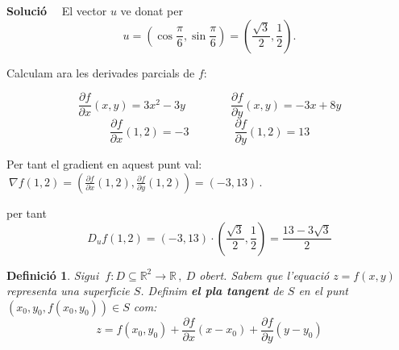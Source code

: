 \documentclass[12pt]{article}
\newcommand{\solucio}{\textbf{Soluci{\'o}}\ \ }
\newtheorem{definicio}{Definici{\'o}}[subsection]
\newtheorem{exemple}{Exemple}[subsection]
\newcommand{\R}{\mathbb{R}}
\begin{document}
\solucio
El vector $u$ ve donat per
\[
u=\left(\cos \frac{\pi}{6},\sin \frac{\pi}{6}\right)= \left(\frac{\sqrt{3}}{2}
,\frac{1}{2}\right).
\]

Calculam ara les derivades parcials de $f$:

$$
\frac{\partial f}{\partial x}(x,y)=3 x^2-3y\qquad\qquad \frac{\partial f}{\partial y}(x,y)=-3x+8 y
$$
$$
\frac{\partial f}{\partial x}(1,2)=-3 \qquad\qquad \frac{\partial f}{\partial y}(1,2)=13
$$

Per tant el gradient en aquest punt val: $\ \nabla f(1,2)=\left(\frac{\partial f}{\partial x}(1,2),\frac{\partial f}{\partial y}(1,2)\right)=(-3,13)\,.$

per tant
\[
D_uf(1,2)=(-3,13)\cdot\left(\frac{\sqrt{3}}{2}
,\frac{1}{2}\right)= \frac{13-3\sqrt{3}}{2}
\]

%
%


\vspace{0.4cm}
\begin{definicio}
Sigui  $\ f:D  \subseteq \R^2\longrightarrow \R\,, \ D$  obert. Sabem que l'equaci{\'o} $z=f(x,y)$ representa una superf{\'\i}cie $S$. Definim  \textbf{el pla tangent} de $S$ en el punt $(x_0,y_0,f(x_0,y_0))\in S$ com:
$$z=f(x_0,y_0)+\frac{\partial f}{\partial x}(x-x_0)+\frac{\partial f}{\partial y}(y-y_0)$$
\end{definicio}
\end{document}
